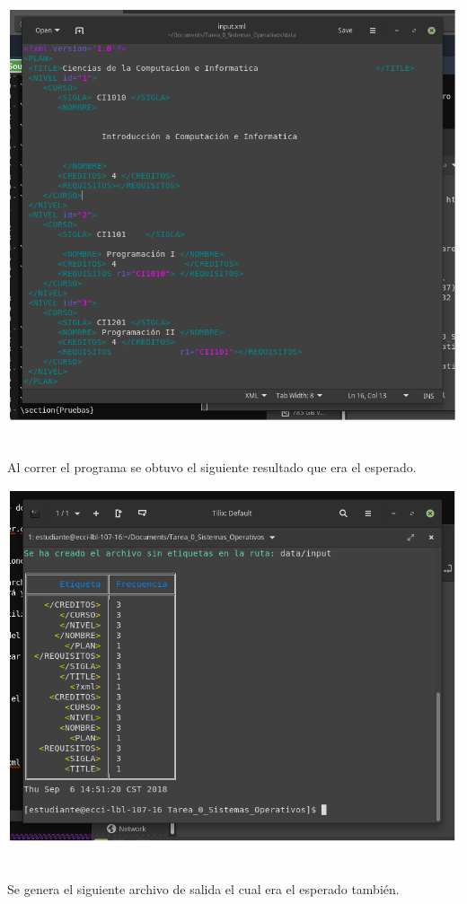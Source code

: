 	 \hfill \includegraphics[scale = 0.4]{pictures/input.png} \hfill \ 
	
	Al correr el programa se obtuvo el siguiente resultado que era el esperado.
	
	 \hfill \includegraphics[scale = 0.4]{pictures/output.png} \hfill \ 
	 
	Se genera el siguiente archivo de salida el cual era el esperado también.
	
